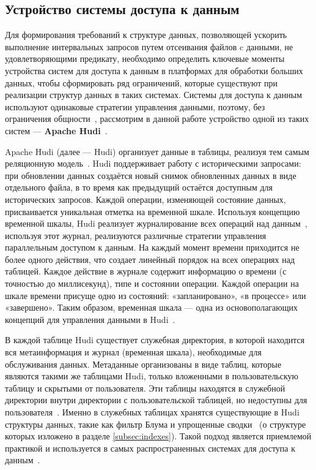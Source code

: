 \subsection{Устройство системы доступа к данным}\label{subsec:systems_for_data_access}

Для формирования требований к структуре данных, позволяющей ускорить выполнение интервальных запросов путем отсеивания файлов c данными, не удовлетворяющими предикату, необходимо определить ключевые моменты устройства систем для доступа к данным в платформах для обработки больших данных, чтобы сформировать ряд ограничений, которые существуют при реализации структур данных в таких системах. Системы для доступа к данным используют одинаковые стратегии управления данными, поэтому, без ограничения общности~\cite{Analyzing_and_comparing_lakehouse_storage_systems}, рассмотрим в данной работе устройство одной из таких систем --- \textbf{Apache Hudi}~\cite{Analyzing_and_comparing_lakehouse_storage_systems}.

Apache Hudi (далее --- Hudi) организует данные в таблицы, реализуя тем самым реляционную модель~\cite{Database_systems_Garcia_Molina}. Hudi поддерживает работу с историческими запросами: при обновлении данных создаётся новый снимок обновленных данных в виде отдельного файла, в то время как предыдущий остаётся доступным для исторических запросов. Каждой операции, изменяющей состояние данных, присваивается уникальная отметка на временной шкале. Используя концепцию временной шкалы, Hudi реализует журналирование всех операций над данным~\cite{A_Logic_of_File_Systems}, используя этот журнал, реализуются различные стратегии управления параллельным доступом к данным. На каждый момент времени приходится не более одного действия, что создает линейный порядок на всех операциях над таблицей. Каждое действие в журнале содержит информацию о времени (с точностью до миллисекунд), типе и состоянии операции. Каждой операции на шкале времени присуще одно из состояний: «запланировано», «в процессе» или «завершено». Таким образом, временная шкала --- одна из основополагающих концепций для управления данными в Hudi~\cite{Hudi_Timeline}.

В каждой таблице Hudi существует служебная директория, в которой находится вся метаинформация и журнал (временная шкала), необходимые для обслуживания данных. Метаданные организованы в виде таблиц, которые  являются такими же таблицами Hudi, только вложенными в пользовательскую таблицу и скрытыми от пользователя. Эти таблицы находятся в служебной директории внутри директории с пользовательской таблицей, но недоступны для пользователя~\cite{Hudi_Metadata}. Именно в служебных таблицах хранятся существующие в Hudi структуры данных, такие как фильтр Блума и упрощенные сводки~ (о структуре которых изложено в разделе \ref{subsec:indexes}). Такой подход является приемлемой практикой и используется в самых распространенных системах для доступа к данным~\cite{Extensible_data_skipping}.

